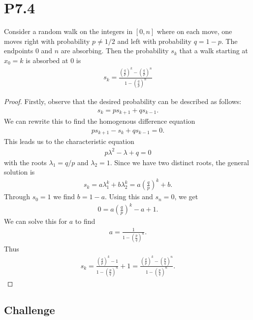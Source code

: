 \documentclass{article}
\begin{document}
\section*{P7.4}


\begin{claim*}
	Consider a random walk on the integers in $[0,n]$ where on each move, one moves right with
	probability $p\not=1/2$ and left with probability $q=1-p$. The endpoints $0$ and $n$ are absorbing.
	Then the probability $s_k$ that a walk starting at $x_0=k$ is absorbed at $0$ is
	\begin{align*}
		s_k = \frac{\left(\frac{q}{p}\right)^k-\left(\frac{q}{p}\right)^n}{1-\left(\frac{q}{p}\right)^n}
	\end{align*}
\end{claim*}
\begin{proof}
	Firstly, observe that the desired probability can be described as follows:
	\begin{align*}
		s_{k} = ps_{k+1} + qs_{k-1}.
	\end{align*}
	We can rewrite this to find the homogenous difference equation
	\begin{align*}
		ps_{k+1} - s_k + qs_{k-1} = 0.
	\end{align*}
	This leads us to the characteristic equation
	\begin{align*}
		p\lambda^2 - \lambda + q = 0
	\end{align*}
	with the roots $\lambda_1 = q/p$ and $\lambda_2 = 1$.
	Since we have two distinct roots, the general solution is
	\begin{align*}
		s_k = a\lambda_1^k + b\lambda_2^k = a\left(\frac{q}{p}\right)^k + b.
	\end{align*}
	Through $s_0=1$ we find $b=1-a$. Using this and $s_n=0$, we get
	\begin{align*}
		0 = a\left(\frac{q}{p}\right)^k - a + 1.
	\end{align*}
	We can solve this for $a$ to find
	\begin{align*}
		a = \frac{1}{1-\left(\frac{p}{q}\right)^n}.
	\end{align*}
	Thus
	\begin{align*}
		s_k =\frac{\left(\frac{q}{p}\right)^k-1}{1-\left(\frac{p}{q}\right)^n}+1
		=\frac{\left(\frac{q}{p}\right)^k-\left(\frac{p}{q}\right)^n}{1-\left(\frac{p}{q}\right)^n}.
	\end{align*}
\end{proof}

\subsection*{Challenge}
\end{document}
